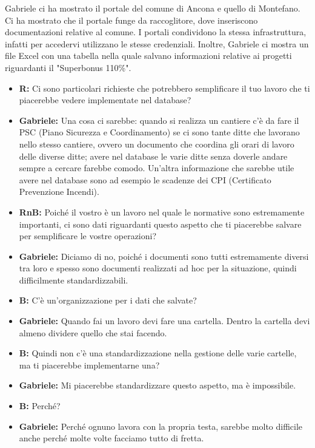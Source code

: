 \documentclass{elegantbook}
\begin{document}
	Gabriele ci ha mostrato il portale del comune di Ancona e quello di Montefano. Ci ha mostrato che il portale funge da raccoglitore, dove inseriscono documentazioni
        relative al comune. I portali condividono la stessa infrastruttura, infatti per accedervi utilizzano le stesse credenziali. Inoltre, Gabriele ci mostra un file Excel
        con una tabella nella quale salvano informazioni relative ai progetti riguardanti il "Superbonus 110\%".
	\\
	\begin{itemize}		
		\item\textbf{R}\textbf{:} Ci sono particolari richieste che potrebbero semplificare il tuo lavoro che ti piacerebbe vedere implementate nel database?
		\item\textbf{Gabriele}\textbf{:} Una cosa ci sarebbe: quando si realizza un cantiere c'è da fare il PSC (Piano Sicurezza e Coordinamento) se ci sono tante
                    ditte che lavorano nello stesso cantiere, ovvero un documento che coordina gli orari di lavoro delle diverse ditte; avere nel database le varie ditte
                    senza doverle andare sempre a cercare farebbe comodo.
		    Un'altra informazione che sarebbe utile avere nel database sono ad esempio le scadenze dei CPI (Certificato Prevenzione Incendi).
		\item\textbf{RnB}\textbf{:} Poiché il vostro è un lavoro nel quale le normative sono estremamente importanti, ci sono dati riguardanti questo aspetto che ti
                    piacerebbe salvare per semplificare le vostre operazioni?
		\item\textbf{Gabriele}\textbf{:} Diciamo di no, poiché i documenti sono tutti estremamente diversi tra loro e spesso sono documenti realizzati ad hoc per la
                    situazione, quindi difficilmente standardizzabili.
		\item\textbf{B}\textbf{:} C'è un'organizzazione per i dati che salvate?
		\item\textbf{Gabriele}\textbf{:} Quando fai un lavoro devi fare una cartella. Dentro la cartella devi almeno dividere quello che stai facendo.
		\item\textbf{B}\textbf{:} Quindi non c'è una standardizzazione nella gestione delle varie cartelle, ma ti piacerebbe implementarne una?
		\item\textbf{Gabriele}\textbf{:} Mi piacerebbe standardizzare questo aspetto, ma è impossibile.
		\item\textbf{B}\textbf{:} Perché?
		\item\textbf{Gabriele}\textbf{:} Perché ognuno lavora con la propria testa, sarebbe molto difficile anche perché molte volte facciamo tutto di fretta.

\end{itemize}
\end{document}

